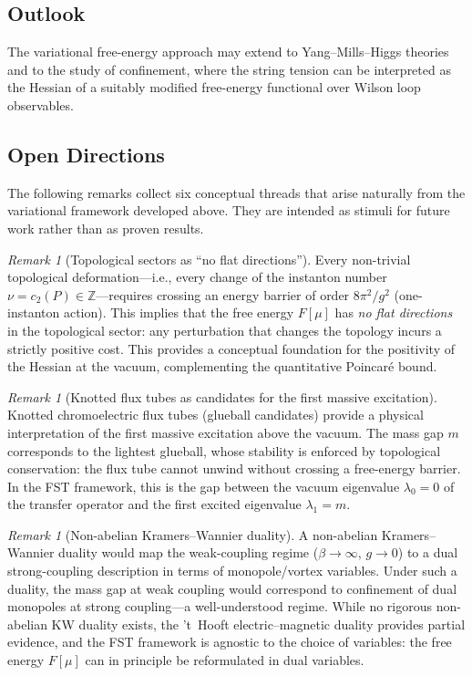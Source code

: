 \documentclass[12pt,a4paper]{article}
\theoremstyle{definition}
\theoremstyle{plain}
\theoremstyle{remark}
\newtheorem{remark}[definition]{Remark}
\begin{document}
\subsection{Outlook}

The variational free-energy approach may extend to Yang--Mills--Higgs theories and to the study of confinement, where the string tension can be interpreted as the Hessian of a suitably modified free-energy functional over Wilson loop observables.


\subsection{Open Directions}

The following remarks collect six conceptual threads that arise naturally from the variational framework developed above. They are intended as stimuli for future work rather than as proven results.

\begin{remark}[Topological sectors as ``no flat directions'']
\label{rem:topological-no-flat}
Every non-trivial topological deformation---i.e., every change of the instanton number $\nu = c_2(P) \in \mathbb{Z}$---requires crossing an energy barrier of order $8\pi^2/g^2$ (one-instanton action). This implies that the free energy $F[\mu]$ has \emph{no flat directions} in the topological sector: any perturbation that changes the topology incurs a strictly positive cost. This provides a conceptual foundation for the positivity of the Hessian at the vacuum, complementing the quantitative Poincar\'e bound.
\end{remark}

\begin{remark}[Knotted flux tubes as candidates for the first massive excitation]
\label{rem:knotted-flux}
Knotted chromoelectric flux tubes (glueball candidates) provide a physical interpretation of the first massive excitation above the vacuum. The mass gap $m$ corresponds to the lightest glueball, whose stability is enforced by topological conservation: the flux tube cannot unwind without crossing a free-energy barrier. In the FST framework, this is the gap between the vacuum eigenvalue $\lambda_0 = 0$ of the transfer operator and the first excited eigenvalue $\lambda_1 = m$.
\end{remark}

\begin{remark}[Non-abelian Kramers--Wannier duality]
\label{rem:non-abelian-kw}
A non-abelian Kramers--Wannier duality would map the weak-coupling regime ($\beta \to \infty$, $g \to 0$) to a dual strong-coupling description in terms of monopole/vortex variables. Under such a duality, the mass gap at weak coupling would correspond to confinement of dual monopoles at strong coupling---a well-understood regime. While no rigorous non-abelian KW duality exists, the 't~Hooft electric--magnetic duality provides partial evidence, and the FST framework is agnostic to the choice of variables: the free energy $F[\mu]$ can in principle be reformulated in dual variables.
\end{remark}
\end{document}
